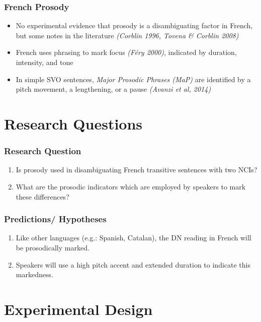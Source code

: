 \documentclass{beamer}
\begin{document}
\begin{frame}
\frametitle{French Prosody}
\begin{itemize}
\item No experimental evidence that prosody is a disambiguating factor in French, but some notes in the literature \textit{(Corblin 1996, Tovena \& Corblin 2008)}
\item French uses phrasing to mark focus \textit{(F\'ery 2000)}, indicated  by duration, intensity, and tone
\item In simple SVO sentences, \textit{Major Prosodic Phrases (MaP)} are identified by a pitch movement, a lengthening, or a pause \textit{(Avanzi et al, 2014)}
\end{itemize}
\end{frame}

\section{Research Questions}
\begin{frame}%
\frametitle{Research Question}
\begin{enumerate}
\item Is prosody used in disambiguating French transitive sentences with two NCIs?
\item What are the prosodic indicators which are employed by speakers to mark these differences?

\end{enumerate}
\end{frame}

\begin{frame}%
\frametitle{Predictions/ Hypotheses}
	\begin{enumerate}
	\item Like other languages (e.g.: Spanish, Catalan), the DN reading in French will be prosodically marked.
	\item Speakers will use a high pitch accent and extended duration to indicate this markedness.
	\end{enumerate}
\end{frame}

\section{Experimental Design}
\end{document}
